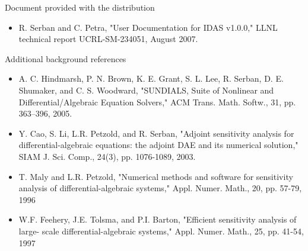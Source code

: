 \documentclass[12pt]{letter}
\begin{document}
\begin{letter}
\begin{enumerate}
Document provided with the distribution
\begin{itemize}
\item R. Serban and C. Petra, "User Documentation for IDAS v1.0.0," 
    LLNL technical report UCRL-SM-234051, August 2007.
\end{itemize}
Additional background references
\begin{itemize}
\item A. C. Hindmarsh, P. N. Brown, K. E. Grant, S. L. Lee, R. Serban, 
    D. E. Shumaker, and C. S. Woodward, "SUNDIALS, Suite of Nonlinear and 
    Differential/Algebraic Equation Solvers," ACM Trans. Math. Softw., 
    31, pp. 363--396, 2005.
\item Y. Cao, S. Li, L.R. Petzold, and R. Serban, "Adjoint sensitivity analysis for 
    differential-algebraic equations: the adjoint DAE and its numerical solution," 
    SIAM J. Sci. Comp., 24(3), pp. 1076-1089, 2003.
\item T. Maly and L.R. Petzold, "Numerical methods and software for sensitivity analysis 
    of differential-algebraic systems," Appl. Numer. Math., 20, pp. 57-79, 1996
\item W.F. Feehery, J.E. Tolsma, and P.I. Barton, "Efficient sensitivity analysis of large-
   scale differential-algebraic systems," Appl. Numer. Math., 25, pp. 41-54, 1997
\end{itemize}
\end{enumerate}

\end{letter}
\end{document}
